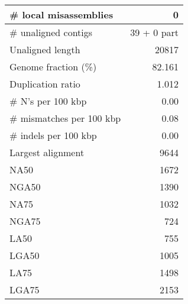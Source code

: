 \documentclass[12pt,a4paper]{article}
\begin{document}
\begin{table}[ht]
\begin{center}
\begin{tabular}{|l*{1}{|r}|}
\# local misassemblies & 0 \\ \hline
\# unaligned contigs & 39 + 0 part \\ \hline
Unaligned length & 20817 \\ \hline
Genome fraction (\%) & 82.161 \\ \hline
Duplication ratio & 1.012 \\ \hline
\# N's per 100 kbp & 0.00 \\ \hline
\# mismatches per 100 kbp & 0.08 \\ \hline
\# indels per 100 kbp & 0.00 \\ \hline
Largest alignment & 9644 \\ \hline
NA50 & 1672 \\ \hline
NGA50 & 1390 \\ \hline
NA75 & 1032 \\ \hline
NGA75 & 724 \\ \hline
LA50 & 755 \\ \hline
LGA50 & 1005 \\ \hline
LA75 & 1498 \\ \hline
LGA75 & 2153 \\ \hline
\end{tabular}
\end{center}
\end{table}
\end{document}
